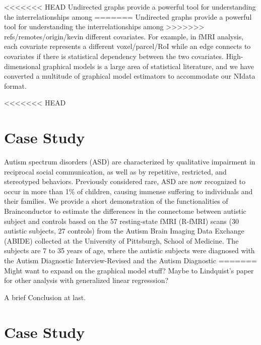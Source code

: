 \documentclass{nature}
\begin{document}
<<<<<<< HEAD
Undirected graphs provide a powerful tool for understanding the interrelationships among
=======
Undirected graphs provide a powerful tool for understanding the
interrelationships among
>>>>>>> refs/remotes/origin/kevin
different covariates. For example, in fMRI analysis, each covariate represents 
a different voxel/parcel/RoI while an edge connects to covariates if there is
statistical dependency between the two covariates. High-dimensional graphical
models is a large area of statistical literature, and we have converted 
a multitude of graphical model estimators to accommodate our NIdata format.

<<<<<<< HEAD



\section{Case Study}

Autism spectrum disorders (ASD) are characterized by qualitative impairment in reciprocal social communication, as well as by repetitive, restricted, and stereotyped behaviors. Previously considered rare, ASD are now recognized to occur in more than 1\% of children, causing immense suffering to individuals and their families. 
We provide a short demonstration of the functionalities of Brainconductor to
estimate the differences in the connectome between autistic subject and controls based
on the 57 resting-state fMRI (R-fMRI) scans (30 autistic subjects, 27 controls) from the Autism
Brain Imaging Data Exchange (ABIDE) collected at the 
University of Pittsburgh, School of Medicine\cite{di2014autism}. 
The subjects are 7 to 35 years of age, where the autistic subjects were
diagnosed with the Autism Diagnostic Interview-Revised and the Autism Diagnostic 
=======
{\color{red}Might want to expand on the graphical model stuff? Maybe to Lindquist's
paper for other analysis with generalized linear regresssion?}


{\color{red}A brief Conclusion at last.}

\section{Case Study}
\end{document}

